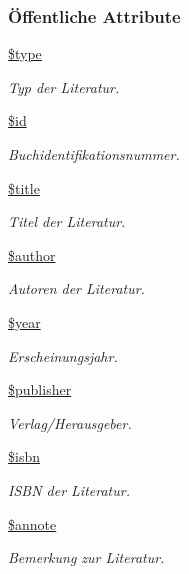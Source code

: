 \subsubsection*{\"{O}ffentliche Attribute}
\begin{CompactItemize}
\item 
\hyperlink{classBibTeX_c308c02e47ae28f70adb8cc9c084786d}{\$type}
\begin{CompactList}\small\item\em Typ der Literatur. \item\end{CompactList}\item 
\hyperlink{classBibTeX_13b46f23224381be3a2693f2832bb0ab}{\$id}
\begin{CompactList}\small\item\em Buchidentifikationsnummer. \item\end{CompactList}\item 
\hyperlink{classBibTeX_17292d55e888dc83accb2ee131d6b8d7}{\$title}
\begin{CompactList}\small\item\em Titel der Literatur. \item\end{CompactList}\item 
\hyperlink{classBibTeX_05df25974ad6f4b708e608f9a40ff186}{\$author}
\begin{CompactList}\small\item\em Autoren der Literatur. \item\end{CompactList}\item 
\hyperlink{classBibTeX_6d4d6589bfbda549bf0d2303f4942b3d}{\$year}
\begin{CompactList}\small\item\em Erscheinungsjahr. \item\end{CompactList}\item 
\hyperlink{classBibTeX_635a5c6fbed663cfd66104596e249303}{\$publisher}
\begin{CompactList}\small\item\em Verlag/Herausgeber. \item\end{CompactList}\item 
\hyperlink{classBibTeX_b803583fb6c220e4e8eb1cf4252d2593}{\$isbn}
\begin{CompactList}\small\item\em ISBN der Literatur. \item\end{CompactList}\item 
\hyperlink{classBibTeX_31f87aba6ba9094f59b6231fa7edd70b}{\$annote}
\begin{CompactList}\small\item\em Bemerkung zur Literatur. \item\end{CompactList}\end{CompactItemize}


